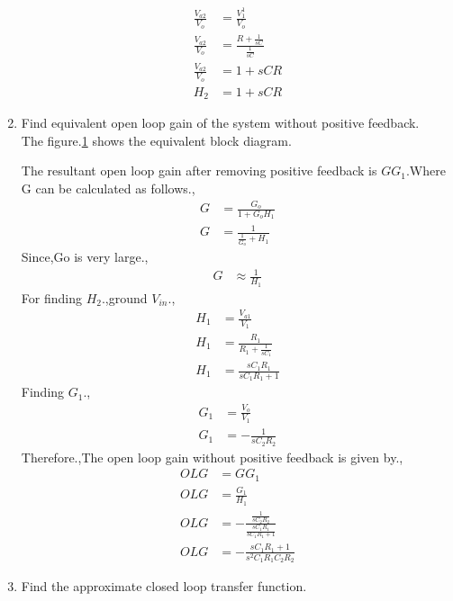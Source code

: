 \begin{enumerate}[label=\arabic*.,ref=\theenumi]
\begin{align}
 \frac{V_{a2}}{V_o} &= \frac{V_1^1}{V_o}\\
 \frac{V_{a2}}{V_o} &= \frac{R+\frac{1}{sC}}{\frac{1}{sC}}\\
 \frac{V_{a2}}{V_o} &= 1+sCR\\
 H_2 &= 1+sCR
\end{align}
\item Find equivalent open loop gain of the system without positive feedback.\\
\solution 
The figure.\ref{fig:block_diagram2} shows the equivalent block diagram.\\
\begin{figure}[!hbt]
	\begin{center}
			\resizebox{\columnwidth}{!}{}
	\end{center}
\caption{}
\label{fig:block_diagram2}
\end{figure}
The resultant open loop gain after removing positive feedback is $GG_1$.Where G can be calculated as follows.,
\begin{align}
    G &= \frac{G_o}{1+G_oH_1}\\
    G &= \frac{1}{\frac{1}{G_o}+H_1}
\end{align}
Since,Go is very large.,
\begin{align}
    G &\approx \frac{1}{H_1}
\end{align}
For finding $H_2$.,ground $V_{in}$.,
\begin{align}
    H_1 &= \frac{V_{a1}}{V_1}\\
    H_1 &= \frac{R_1}{R_1+\frac{1}{sC_1}}\\
    H_1 &= \frac{sC_1R_1}{sC_1R_1+1}
\end{align}
Finding $G_1$.,
\begin{align}
    G_1 &= \frac{V_o}{V_1}\\
    G_1 &= -\frac{1}{sC_2R_2}
\end{align}
Therefore.,The open loop gain without positive feedback is given by.,
\begin{align}
    OLG &= GG_1\\
    OLG &= \frac{G_1}{H_1}\\
    OLG &= -\frac{\frac{1}{sC_2R_2}}{\frac{sC_1R_1}{sC_1R_1+1}}\\
    OLG &= -\frac{sC_1R_1+1}{s^2C_1R_1C_2R_2}
\end{align}
\item Find the approximate closed loop transfer function.\\

\end{enumerate}
